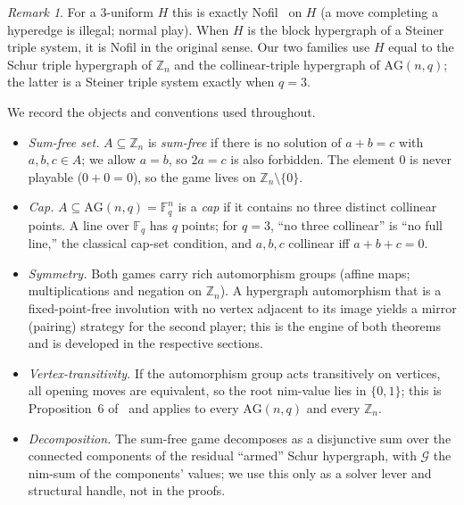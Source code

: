\documentclass[11pt]{article}
\theoremstyle{plain}
\theoremstyle{definition}
\theoremstyle{remark}
\newtheorem{remark}{Remark}
\newcommand{\Zn}[1]{\mathbb{Z}_{#1}}
\newcommand{\Fq}{\mathbb{F}_q}
\newcommand{\AG}{\mathrm{AG}}
\newcommand{\Grundy}{\mathcal{G}}       %
\begin{document}
\begin{remark}
For a $3$-uniform $H$ this is exactly Nofil~\cite{huggan2022nofil} on $H$ (a move completing a
hyperedge is illegal; normal play). When $H$ is the block hypergraph of a Steiner triple system,
it is Nofil in the original sense. Our two families use $H$ equal to the Schur triple hypergraph
of $\Zn{n}$ and the collinear-triple hypergraph of $\AG(n,q)$; the latter is a Steiner triple
system exactly when $q=3$.
\end{remark}

We record the objects and conventions used throughout.
\begin{itemize}
  \item \emph{Sum-free set.} $A \subseteq \Zn{n}$ is \emph{sum-free} if there is no solution of
    $a+b=c$ with $a,b,c \in A$; we allow $a=b$, so $2a=c$ is also forbidden. The element $0$ is
    never playable ($0+0=0$), so the game lives on $\Zn{n} \setminus \{0\}$.
  \item \emph{Cap.} $A \subseteq \AG(n,q)=\Fq^n$ is a \emph{cap} if it contains no three distinct
    collinear points. A line over $\Fq$ has $q$ points; for $q=3$, ``no three collinear'' is ``no
    full line,'' the classical cap-set condition, and $a,b,c$ collinear iff $a+b+c=0$.
  \item \emph{Symmetry.} Both games carry rich automorphism groups (affine maps; multiplications
    and negation on $\Zn{n}$). A hypergraph automorphism that is a fixed-point-free involution with
    no vertex adjacent to its image yields a mirror (pairing) strategy for the second player; this
    is the engine of both theorems and is developed in the respective sections.
  \item \emph{Vertex-transitivity.} If the automorphism group acts transitively on vertices, all
    opening moves are equivalent, so the root nim-value lies in $\{0,1\}$; this is Proposition~6
    of~\cite{huggan2022nofil} and applies to every $\AG(n,q)$ and every $\Zn{n}$.
  \item \emph{Decomposition.} The sum-free game decomposes as a disjunctive sum over the connected
    components of the residual ``armed'' Schur hypergraph, with $\Grundy$ the nim-sum of the
    components' values; we use this only as a solver lever and structural handle, not in the proofs.
\end{itemize}

\end{document}
